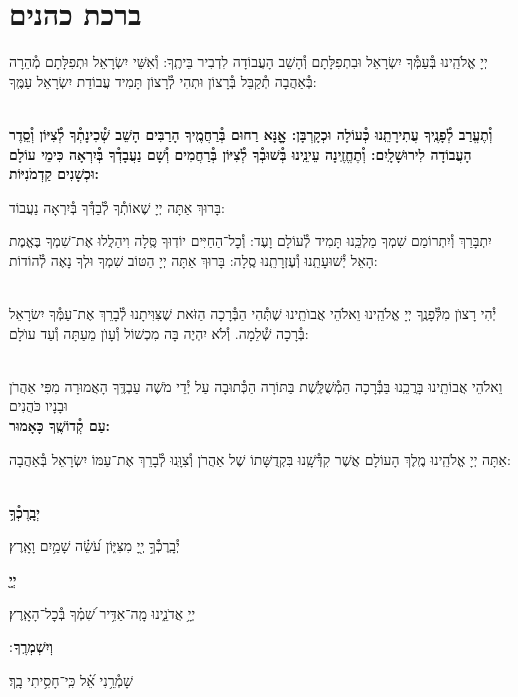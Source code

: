 \documentclass[twoside, openany, parskip=half, 11pt]{book}
\begin{document}
\sepline

\clearpage

\vspace{-1\baselineskip}
\section[ברכת כהנים]{ ברכת כהנים ‎}
\label{birkaskohanim}

יְיָ אֱלֹהֵֽינוּ בְּ֯עַמְּ֯ךָ יִשְׂרָאֵל וּבִתְפִלָּתָם וְ֯הָשֵׁב הָעֲבוֹדָה לִדְבִיר בֵּיתֶֽךָ: וְ֯אִשֵּׁי יִשְׂרָאֵל וּתְפִלָּתָם מְ֯הֵרָה בְּ֯אַהֲבָה תְ֯קַבֵּל בְּ֯רָצוֹן וּתְהִי לְ֯רָצוֹן תָּמִיד עֲבוֹדַת יִשְׂרָאֵל עַמֶּֽךָ:

\chazzanvkahal \\
\textbf{
וְ֯תֶעֱרַב לְ֯פָנֶֽיךָ עֲתִירָתֵֽנוּ כְּ֯עוֹלָה וּכְקָרְבָּן:
אׇׇׇנָּא רַחוּם בְּ֯רַחֲמֶֽיךָ הָרַבִּים הָשֵׁב שְׁ֯כִינָתְ֯ךָ לְ֯צִיּוֹן וְ֯סֵֽדֶר הָעֲבוֹדָה לִירוּשָׁלָֽיִם:
וְ֯תֶחֱזֶֽינָה עֵינֵֽינוּ בְּ֯שׁוּבְ֯ךָ לְ֯צִיּוֹן בְּ֯רַחֲמִים
וְ֯שָׁם נַעֲבָדְ֯ךָ בְּ֯יִרְאָה כִּימֵי עוֹלָם וּכְשָׁנִים קַדְמֹנִיּוֹת:
}

\chazzan
בָּרוּךְ אַתָּה יְיָ שֶׁאוֹתְ֯ךָ לְ֯בַדְּ֯ךָ בְּ֯יִרְאָה נַעֲבוֹד:

\modim

יִתְבָּרַךְ וְ֯יִתְרוֹמַם שִׁמְךָ מַלְכֵּֽנוּ תָּמִיד לְ֯עוֹלָם וָעֶד: וְ֯כׇל־הַחַיִּים יוֹדֽוּךָ סֶּֽלָה וִיהַלֲלוּ אֶת־שִׁמְךָ בֶּאֱמֶת הָאֵל יְ֯שׁוּעָתֵֽנוּ וְ֯עֶזְרָתֵֽנוּ סֶֽלָה: בָּרוּךְ אַתָּה יְיָ הַטּוֹב שִׁמְךָ וּלְךָ נָאֶה לְ֯הוֹדוֹת:

\\
יְ֯הִי רָצוׂן מִלְּ֯פָנֶֽךָ יְיָ אֱלֹהֵֽינוּ וֵאלֹהֵי אֲבוׂתֵֽינוּ שֶׁתְּ֯הִי הַבְּ֯רָכָה הַזֹּאת שֶׁצִּוִּיתָנוּ לְ֯בָרֵךְ אֶת־עַמְּ֯ךָ יִשׂרָאֵל בְּ֯רָכָה שְׁ֯לֵמָה. וְ֯לֹא יִהְיֶה בָּה מִכְשׁוֹל וְ֯עָוׂן מֵעַתָּה וְ֯עַד עוׂלָם:

\\
\shatz {}
וֵאלֹהֵי אֲבוֹתֵֽינוּ בָּרֲכֵֽנוּ בַּבְּ֯רָכָה הַמְ֯שֻׁלֶּֽשֶׁת בַּתּוֹרָה הַכְּ֯תוּבָה עַל יְ֯דֵי מֹשֶׁה עַבְדֶּֽךָ הָאֲמוּרָה מִפִּי אַהֲרֹן וּבָנָיו כֹּהֲנִים \\
\shatzvkahal
\textbf{עַם קְ֯דוֹשֶֽׁךָ כָּאָמוּר:}

אַתָּה יְיָ אֱלֹהֵֽינוּ מֶֽלֶךְ הָעוֹלָם אֲשֶׁר קִדְּ֯שָֽׁנוּ בִּקְדֻשָּׁתוֹ שֶׁל אַהֲרֹן וְ֯צִוָּֽנוּ לְ֯בָרֵךְ אֶת־עַמּוֹ יִשְׂרָאֵל בְּ֯אַהֲבָה:


\\
\textbf{יְבָֽרֶכְ֯ךָ֥}
\hfill \begin{footnotesize}
 יְ֯בָֽרֶכְ֯ךָ֣ יְ֖יָ מִצִּיּ֑וֹן עֹ֝שֵׂ֗ה שָׁמַ֥יִם וָאָֽרֶץ׃\\
\end{footnotesize}
\textbf{יְיָ֖}
\hfill \begin{footnotesize}
 יְיָ֥ אֲדֹנֵ֑ינוּ מָֽה־אַדִּ֥יר שִׁ֝מְ֗ךָ בְּ֯כׇל־הָאָֽרֶץ׃\\
\end{footnotesize}
\textbf{וְיִשְׁמְרֶֽךָ}
׃ \hfill \begin{footnotesize}
 שָׁמְ֯רֵ֥נִי אֵ֝֗ל כִּֽי־חָסִ֥יתִי בָֽךְ׃
\end{footnotesize}
\end{document}
